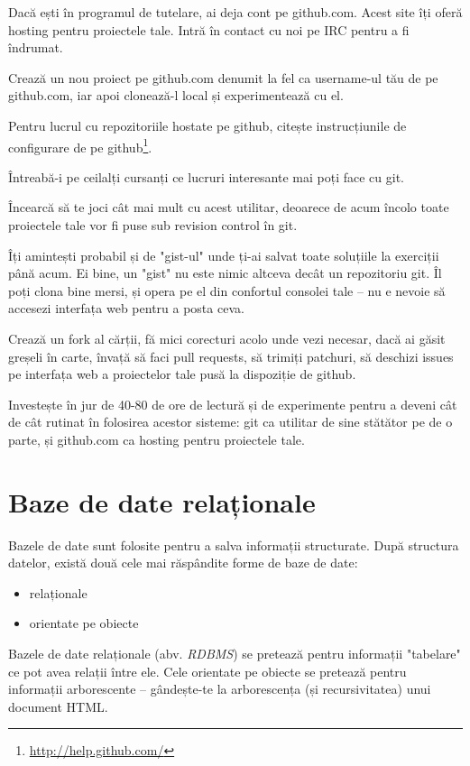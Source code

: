 \begin{Exercise}[title={A taste of git}]
Dacă ești în programul de tutelare, ai deja cont pe github.com.
Acest site îți oferă hosting pentru proiectele tale. Intră
în contact cu noi pe IRC pentru a fi îndrumat.

Crează un nou proiect pe github.com denumit la fel ca username-ul
tău de pe github.com, iar apoi clonează-l local și experimentează
cu el.

Pentru lucrul cu repozitoriile hostate pe github, citește instrucțiunile
de configurare de pe github\footnote{\url{http://help.github.com/}}.

Întreabă-i pe ceilalți cursanți ce lucruri interesante mai poți face
cu git.

Încearcă să te joci cât mai mult cu acest utilitar, deoarece de acum
încolo toate proiectele tale vor fi puse sub revision control în git.

Îți amintești probabil și de "gist-ul" unde ți-ai salvat toate soluțiile
la exerciții până acum. Ei bine, un "gist" nu este nimic altceva decât
un repozitoriu git. Îl poți clona bine mersi, și opera pe el
din confortul consolei tale -- nu e nevoie să accesezi interfața
web pentru a posta ceva.

Crează un fork al cărții, fă mici corecturi acolo unde vezi necesar,
dacă ai găsit greșeli în carte, învață să faci pull
requests, să trimiți patchuri, să deschizi issues pe interfața web
a proiectelor tale pusă la dispoziție de github.

Investește în jur de 40-80 de ore de lectură și de experimente pentru
a deveni cât de cât rutinat în folosirea acestor sisteme: git
ca utilitar de sine stătător pe de o parte, și github.com ca
hosting pentru proiectele tale.
\end{Exercise}

\section{Baze de date relaționale}
Bazele de date sunt folosite pentru a salva informații structurate.
După structura datelor, există două cele mai răspândite forme de
baze de date:
\begin{itemize}
\item relaționale
\item orientate pe obiecte
\end{itemize}
Bazele de date relaționale (abv. \textsl{RDBMS}) se pretează pentru informații "tabelare"
ce pot avea relații între ele. Cele orientate pe obiecte se pretează
pentru informații arborescente -- gândește-te la arborescența
(și recursivitatea) unui document HTML.



